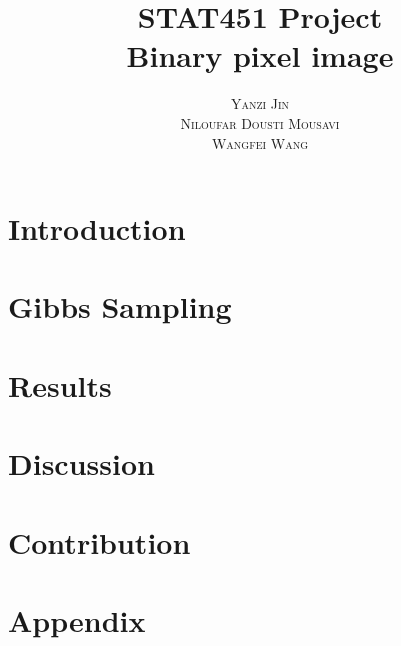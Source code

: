 \documentclass[12pt]{article}
\title{\Huge \textbf{STAT451 Project}   \\ \huge Binary pixel image }
\author{\textsc{Yanzi Jin} \\\textsc{Niloufar Dousti Mousavi}\\ \textsc{Wangfei Wang}}
\date{\vspace{-5ex}}
\begin{document}
\maketitle
\thispagestyle{empty}
\clearpage
\setcounter{page}{1}




\section{Introduction}


\section{Gibbs Sampling}


\section{Results}


\section{Discussion}


\section{Contribution}


\newpage
\section{Appendix}



 
 
\end{document}
